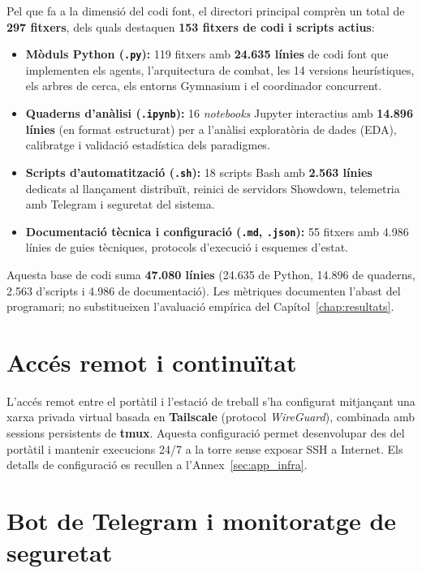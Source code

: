 Pel que fa a la dimensió del codi font, el directori principal  comprèn un total de \textbf{297 fitxers}, dels quals destaquen \textbf{153 fitxers de codi i scripts actius}:
\begin{itemize}
    \item \textbf{Mòduls Python (\texttt{.py}):} 119 fitxers amb \textbf{24.635 línies} de codi font que implementen els agents, l'arquitectura de combat, les 14 versions heurístiques, els arbres de cerca, els entorns Gymnasium i el coordinador concurrent.
    \item \textbf{Quaderns d'anàlisi (\texttt{.ipynb}):} 16 \textit{notebooks} Jupyter interactius amb \textbf{14.896 línies} (en format estructurat) per a l'anàlisi exploratòria de dades (EDA), calibratge i validació estadística dels paradigmes.
    \item \textbf{Scripts d'automatització (\texttt{.sh}):} 18 scripts Bash amb \textbf{2.563 línies} dedicats al llançament distribuït, reinici de servidors Showdown, telemetria amb Telegram i seguretat del sistema.
    \item \textbf{Documentació tècnica i configuració (\texttt{.md}, \texttt{.json}):} 55 fitxers amb 4.986 línies de guies tècniques, protocols d'execució i esquemes d'estat.
\end{itemize}
Aquesta base de codi suma \textbf{47.080 línies} (24.635 de Python, 14.896 de quaderns, 2.563 d'scripts i 4.986 de documentació). Les mètriques documenten l'abast del programari; no substitueixen l'avaluació empírica del Capítol~\ref{chap:resultats}.

\section{Accés remot i continuïtat}
\label{sec:tailscale}

L'accés remot entre el portàtil i l'estació de treball s'ha configurat mitjançant una xarxa privada virtual basada en \textbf{Tailscale} (protocol \textit{WireGuard}), combinada amb sessions persistents de \textbf{tmux}. Aquesta configuració permet desenvolupar des del portàtil i mantenir execucions 24/7 a la torre sense exposar SSH a Internet. Els detalls de configuració es recullen a l'Annex~\ref{sec:app_infra}.

\section{Bot de Telegram i monitoratge de seguretat}
\label{sec:telegram_bot}

